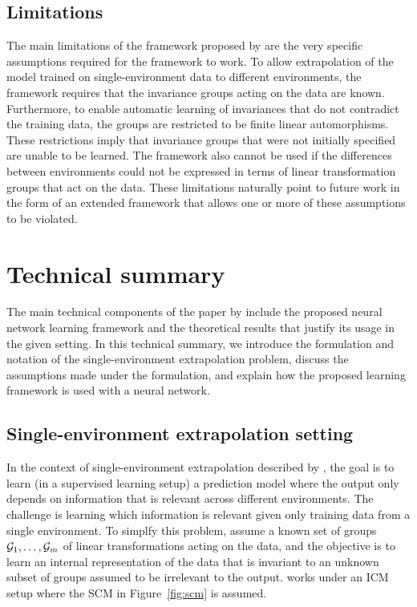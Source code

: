  
\subsection{Limitations}

The main limitations of the framework proposed by \textcite{Mouli:2021} are the very specific assumptions required for the framework to work. To allow extrapolation of the model trained on single-environment data to different environments, the framework requires that the invariance groups acting on the data are known. Furthermore, to enable automatic learning of invariances that do not contradict the training data, the groups are restricted to be finite linear automorphisms. These restrictions imply that invariance groups that were not initially specified are unable to be learned. The framework also cannot be used if the differences between environments could not be expressed in terms of linear transformation groups that act on the data. These limitations naturally point to future work in the form of an extended framework that allows one or more of these assumptions to be violated.


\newpage


\section{Technical summary}

The main technical components of the paper by \textcite{Mouli:2021} include the proposed neural network learning framework and the theoretical results that justify its usage in the given setting. In this technical summary, we introduce the formulation and notation of the single-environment extrapolation problem, discuss the assumptions made under the formulation, and explain how the proposed learning framework is used with a neural network.


\subsection{Single-environment extrapolation setting}

In the context of single-environment extrapolation described by \textcite{Mouli:2021}, the goal is to learn (in a supervised learning setup) a prediction model where the output  only depends on information that is relevant across different environments. The challenge is learning which information is relevant given only training data from a single environment. To simplfy this problem, \citeauthor{Mouli:2021} assume a known set of groups $\mathcal{G}_1,\ldots,\mathcal{G}_m$ of linear transformations acting on the data, and the objective is to learn an internal representation of the data that is invariant to an unknown subset of groups assumed to be irrelevant to the output. \citeauthor{Mouli:2021} works under an ICM setup where the SCM in Figure~\ref{fig:scm} is assumed.

